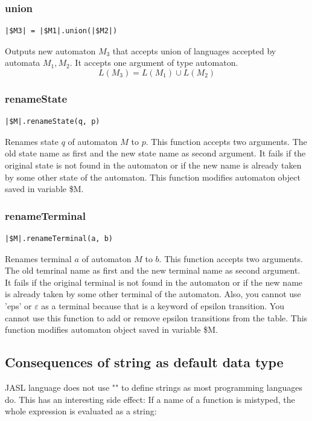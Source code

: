 \documentclass{ctuthesis}
\begin{document}
\subsubsection{union}
\begin{lstlisting}[language = JASL_snippet]
	|$M3| = |$M1|.union(|$M2|)
\end{lstlisting}

Outputs new automaton $M_3$ that accepts union of languages accepted by automata $M_1, M_2$. It accepts one argument of type automaton.
\begin{equation*}
L(M_3) = L(M_1) \cup L(M_2)
\end{equation*}

\subsubsection{renameState}
\begin{lstlisting}[language = JASL_snippet]
	|$M|.renameState(q, p)
\end{lstlisting}

Renames state $q$ of automaton $M$ to $p$. This function accepts two arguments. The old state name as first and the new state name as second argument. It fails if the original state is not found in the automaton or if the new name is already taken by some other state of the automaton. This function modifies automaton object saved in variable \$M.


\subsubsection{renameTerminal}
 \begin{lstlisting}[language = JASL_snippet]
	|$M|.renameTerminal(a, b)
\end{lstlisting}

Renames terminal $a$ of automaton $M$ to $b$. This function accepts two arguments. The old temrinal name as first and the new terminal name as second argument. It fails if the original terminal is not found in the automaton or if the new name is already taken by some other terminal of the automaton. Also, you cannot use 'eps' or $\varepsilon$ as a terminal because that is a keyword of epsilon transition. You cannot use this function to add or remove epsilon transitions from the table. This function modifies automaton object saved in variable \$M.

\subsection{Consequences of string as default data type}
JASL language does not use "" to define strings as most programming languages do. This has an interesting side effect: If a name of a function is mistyped, the whole expression is evaluated as a string:
\end{document}
